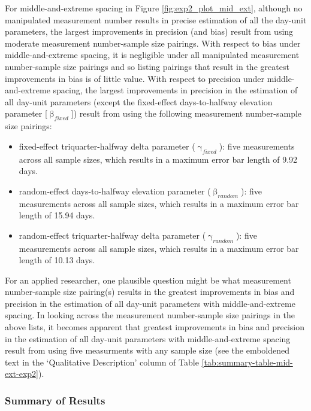 \documentclass[
12pt, %
twoside,
english]{guelphthesis}
\theoremstyle{definition}
\theoremstyle{definition}
\theoremstyle{definition}
\theoremstyle{definition}
\theoremstyle{remark}
\begin{document}
For middle-and-extreme spacing in Figure \ref{fig:exp2_plot_mid_ext}, although no manipulated measurement number results in precise estimation of all the day-unit parameters, the largest improvements in precision (and bias) result from using moderate measurement number-sample size pairings. With respect to bias under middle-and-extreme spacing, it is negligible under all manipulated measurement number-sample size pairings and so listing pairings that result in the greatest improvements in bias is of little value. With respect to precision under middle-and-extreme spacing, the largest improvements in precision in the estimation of all day-unit parameters (except the fixed-effect days-to-halfway elevation parameter {[}\(\upbeta_{fixed}\){]}) result from using the following measurement number-sample size pairings:
\begin{itemize}
\tightlist
\item
  fixed-effect triquarter-halfway delta parameter (\(\upgamma_{fixed}\)): five measurements across all sample sizes, which results in a maximum error bar length of 9.92 days.
\item
  random-effect days-to-halfway elevation parameter (\(\upbeta_{random}\)): five measurements across all sample sizes, which results in a maximum error bar length of 15.94 days.
\item
  random-effect triquarter-halfway delta parameter (\(\upgamma_{random}\)): five measurements across all sample sizes, which results in a maximum error bar length of 10.13 days.
\end{itemize}
For an applied researcher, one plausible question might be what measurement number-sample size pairing(s) results in the greatest improvements in bias and precision in the estimation of all day-unit parameters with middle-and-extreme spacing. In looking across the measurement number-sample size pairings in the above lists, it becomes apparent that greatest improvements in bias and precision in the estimation of all day-unit parameters with middle-and-extreme spacing result from using five measurments with any sample size (see the emboldened text in the `Qualitative Description' column of Table \ref{tab:summary-table-mid-ext-exp2}).

\hypertarget{summary-of-results-7}{%
\subsubsection{Summary of Results}\label{summary-of-results-7}}
\end{document}
